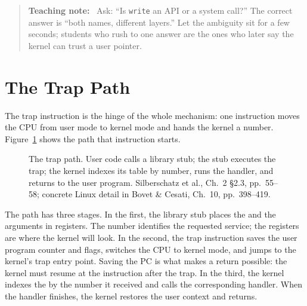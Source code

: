 \documentclass[11pt]{article}
\newenvironment{teachingaside}{\begin{quote}\small\color{primary-gold}\textbf{Teaching note:}\ }{\end{quote}}
\begin{document}
\begin{teachingaside}
Ask: ``Is \texttt{write} an API or a system call?'' The correct answer is ``both names, different layers.'' Let the ambiguity sit for a few seconds; students who rush to one answer are the ones who later say the kernel can trust a user pointer.
\end{teachingaside}

\section{The Trap Path}

The trap instruction is the hinge of the whole mechanism: one instruction moves the CPU from user mode to kernel mode and hands the kernel a number. Figure~\ref{fig:trap-path} shows the path that instruction starts.

\begin{figure}[h]
\centering
{}
\caption{The trap path. User code calls a library stub; the stub executes the trap; the kernel indexes its table by number, runs the handler, and returns to the user program. Silberschatz et al., Ch.~2 \S2.3, pp.~55--58; concrete Linux detail in Bovet \& Cesati, Ch.~10, pp.~398--419.}
\label{fig:trap-path}
\end{figure}

The path has three stages. In the first, the library stub places the  and the arguments in registers. The number identifies the requested service; the registers are where the kernel will look. In the second, the trap instruction saves the user program counter and flags, switches the CPU to kernel mode, and jumps to the kernel's trap entry point. Saving the PC is what makes a return possible: the kernel must resume at the instruction after the trap. In the third, the kernel indexes the  by the number it received and calls the corresponding handler. When the handler finishes, the kernel restores the user context and returns.
\end{document}
